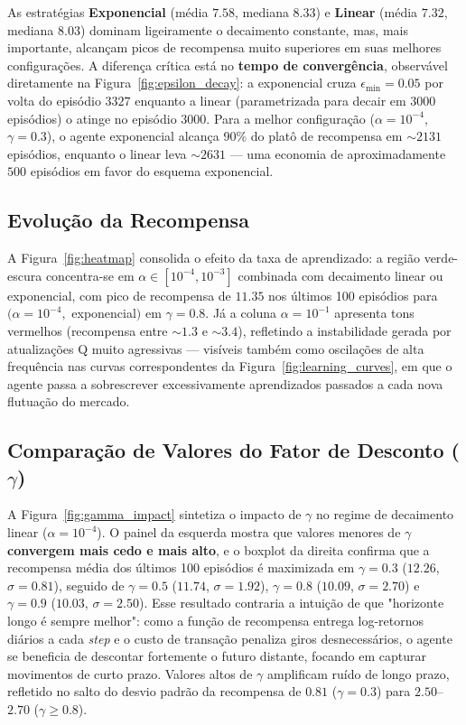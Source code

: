 \documentclass{article}
\begin{document}
As estratégias \textbf{Exponencial} (média $7.58$, mediana $8.33$) e \textbf{Linear} (média $7.32$, mediana $8.03$) dominam ligeiramente o decaimento constante, mas, mais importante, alcançam picos de recompensa muito superiores em suas melhores configurações. A diferença crítica está no \textbf{tempo de convergência}, observável diretamente na Figura~\ref{fig:epsilon_decay}: a exponencial cruza $\epsilon_{\min}=0.05$ por volta do episódio $3327$ enquanto a linear (parametrizada para decair em $3000$ episódios) o atinge no episódio $3000$. Para a melhor configuração ($\alpha=10^{-4}$, $\gamma=0.3$), o agente exponencial alcança 90\% do platô de recompensa em $\sim$$2131$ episódios, enquanto o linear leva $\sim$$2631$ — uma economia de aproximadamente $500$ episódios em favor do esquema exponencial.

\subsection{Evolução da Recompensa}
A Figura~\ref{fig:heatmap} consolida o efeito da taxa de aprendizado: a região verde-escura concentra-se em $\alpha \in [10^{-4}, 10^{-3}]$ combinada com decaimento linear ou exponencial, com pico de recompensa de $11.35$ nos últimos 100 episódios para $(\alpha=10^{-4},$ exponencial$)$ em $\gamma=0.8$. Já a coluna $\alpha = 10^{-1}$ apresenta tons vermelhos (recompensa entre $\sim$$1.3$ e $\sim$$3.4$), refletindo a instabilidade gerada por atualizações Q muito agressivas — visíveis também como oscilações de alta frequência nas curvas correspondentes da Figura~\ref{fig:learning_curves}, em que o agente passa a sobrescrever excessivamente aprendizados passados a cada nova flutuação do mercado.

\subsection{Comparação de Valores do Fator de Desconto ($\gamma$)}
A Figura~\ref{fig:gamma_impact} sintetiza o impacto de $\gamma$ no regime de decaimento linear ($\alpha=10^{-4}$). O painel da esquerda mostra que valores menores de $\gamma$ \textbf{convergem mais cedo e mais alto}, e o boxplot da direita confirma que a recompensa média dos últimos 100 episódios é maximizada em $\gamma=0.3$ ($12.26$, $\sigma=0.81$), seguido de $\gamma=0.5$ ($11.74$, $\sigma=1.92$), $\gamma=0.8$ ($10.09$, $\sigma=2.70$) e $\gamma=0.9$ ($10.03$, $\sigma=2.50$). Esse resultado contraria a intuição de que "horizonte longo é sempre melhor": como a função de recompensa entrega log-retornos diários a cada \textit{step} e o custo de transação penaliza giros desnecessários, o agente se beneficia de descontar fortemente o futuro distante, focando em capturar movimentos de curto prazo. Valores altos de $\gamma$ amplificam ruído de longo prazo, refletido no salto do desvio padrão da recompensa de $0.81$ ($\gamma=0.3$) para $2.50$–$2.70$ ($\gamma\geq0.8$).
\end{document}
